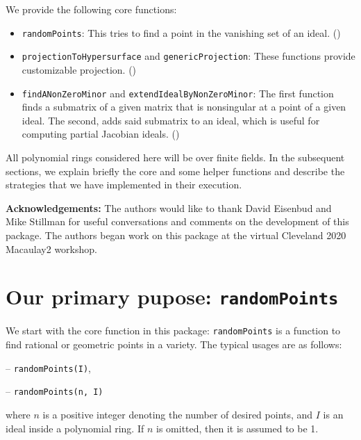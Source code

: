 \documentclass[11pt]{amsart}
\theoremstyle{definition}
\begin{document}
    We provide the following core functions:
    \begin{itemize}    
    \item {\tt randomPoints}:  This tries to find a point in the vanishing set of an ideal. ()
    \item {\tt projectionToHypersurface} and {\tt genericProjection}: These functions provide customizable projection. () 	
    \item {\tt findANonZeroMinor} and {\tt extendIdealByNonZeroMinor}:  The first function finds a submatrix of a given matrix that is nonsingular at a point of a given ideal.  The second, adds said submatrix to an ideal, which is useful for computing partial Jacobian ideals.  ()          
    \end{itemize}

    All polynomial rings considered here will be over finite fields. In the subsequent sections, we explain briefly the core and some helper functions and describe the strategies that we have implemented in their execution.

    \vspace{1em}
    \noindent \textbf{Acknowledgements:} The authors would like to thank David Eisenbud and Mike Stillman for useful conversations and comments on the development of this package.  The authors began work on this package at the virtual Cleveland 2020 Macaulay2 workshop.

\section{Our primary pupose: {\tt randomPoints}}\label{randomPoints}
    We start with the core function in this package:  {\tt randomPoints} is a function to find rational or geometric points in a variety. The typical usages are as follows: 

    \vspace{0.5em}
    -- {\tt randomPoints(I)}, 

    -- {\tt randomPoints(n, I)} 

    \vspace{0.5em}
    \noindent where $n$ is a positive integer denoting the number of desired points, and 
    $I$ is an ideal inside a polynomial ring.  If {$ n$} is omitted, then it is assumed to be 1.
\end{document}
